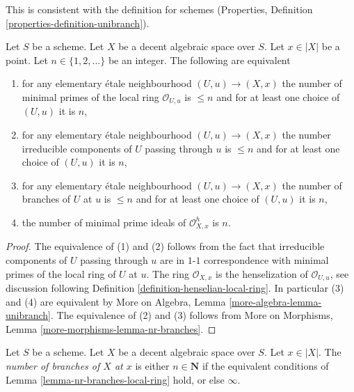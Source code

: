 \noindent
This is consistent with the definition for schemes
(Properties, Definition \ref{properties-definition-unibranch}).

\begin{lemma}
\label{lemma-nr-branches-local-ring}
Let $S$ be a scheme. Let $X$ be a decent algebraic space over $S$.
Let $x \in |X|$ be a point. Let $n \in \{1, 2, \ldots\}$ be an integer.
The following are equivalent
\begin{enumerate}
\item for any elementary \'etale neighbourhood $(U, u) \to (X, x)$
the number of minimal primes of the local ring $\mathcal{O}_{U, u}$
is $\leq n$ and for at least one choice of $(U, u)$ it is $n$,
\item for any elementary \'etale neighbourhood $(U, u) \to (X, x)$
the number irreducible components of $U$ passing through $u$ is $\leq n$
and for at least one choice of $(U, u)$ it is $n$,
\item for any elementary \'etale neighbourhood $(U, u) \to (X, x)$
the number of branches of $U$ at $u$ is $\leq n$
and for at least one choice of $(U, u)$ it is $n$,
\item the number of minimal prime ideals of
$\mathcal{O}_{X, x}^h$ is $n$.
\end{enumerate}
\end{lemma}

\begin{proof}
The equivalence of (1) and (2) follows from the fact that irreducible
components of $U$ passing through $u$ are in $1$-$1$ correspondence with
minimal primes of the local ring of $U$ at $u$.
The ring $\mathcal{O}_{X, x}$ is the henselization of $\mathcal{O}_{U, u}$, see
discussion following Definition \ref{definition-henselian-local-ring}.
In particular (3) and (4) are equivalent by
More on Algebra, Lemma \ref{more-algebra-lemma-unibranch}.
The equivalence of (2) and (3) follows from
More on Morphisms, Lemma \ref{more-morphisms-lemma-nr-branches}.
\end{proof}

\begin{definition}
\label{definition-number-of-geometric-branches}
Let $S$ be a scheme. Let $X$ be a decent algebraic space over $S$.
Let $x \in |X|$. The {\it number of branches of $X$ at $x$} is
either $n \in \mathbf{N}$ if the equivalent conditions
of Lemma \ref{lemma-nr-branches-local-ring}
hold, or else $\infty$.
\end{definition}






